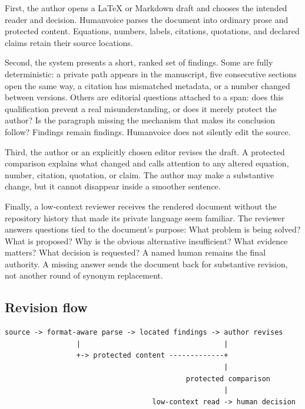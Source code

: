 \documentclass[
  11pt,
  english,
]{article}
\begin{document}
First, the author opens a LaTeX or Markdown draft and chooses the
intended reader and decision. Humanvoice parses the document into
ordinary prose and protected content. Equations, numbers, labels,
citations, quotations, and declared claims retain their source
locations.

Second, the system presents a short, ranked set of findings. Some are
fully deterministic: a private path appears in the manuscript, five
consecutive sections open the same way, a citation has mismatched
metadata, or a number changed between versions. Others are editorial
questions attached to a span: does this qualification prevent a real
misunderstanding, or does it merely protect the author? Is the paragraph
missing the mechanism that makes its conclusion follow? Findings remain
findings. Humanvoice does not silently edit the source.

Third, the author or an explicitly chosen editor revises the draft. A
protected comparison explains what changed and calls attention to any
altered equation, number, citation, quotation, or claim. The author may
make a substantive change, but it cannot disappear inside a smoother
sentence.

Finally, a low-context reviewer receives the rendered document without
the repository history that made its private language seem familiar. The
reviewer answers questions tied to the document's purpose: What problem
is being solved? What is proposed? Why is the obvious alternative
insufficient? What evidence matters? What decision is requested? A named
human remains the final authority. A missing answer sends the document
back for substantive revision, not another round of synonym replacement.

\hypertarget{revision-flow}{%
\subsection{Revision flow}\label{revision-flow}}

\begin{verbatim}
source -> format-aware parse -> located findings -> author revises
                 |                                  |
                 +-> protected content -------------+
                                                    |
                                           protected comparison
                                                    |
                                   low-context read -> human decision
\end{verbatim}
\end{document}
